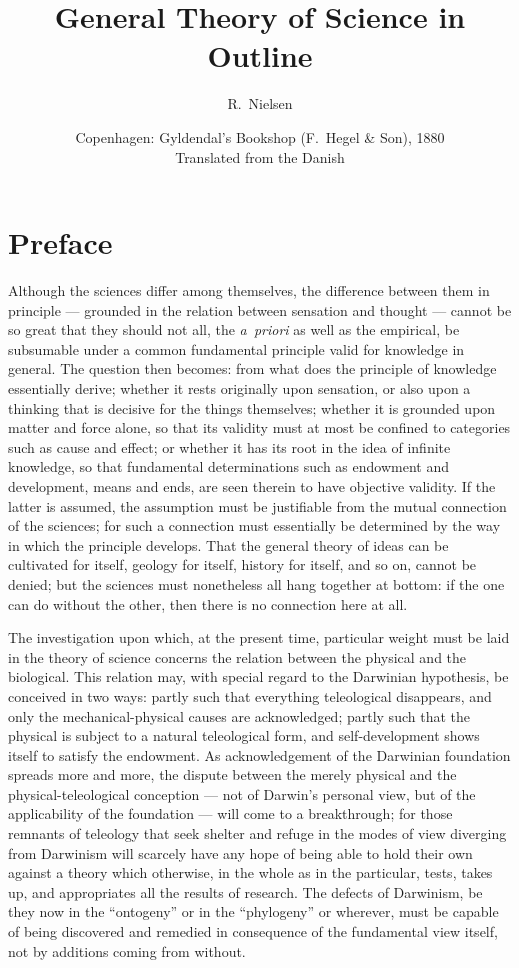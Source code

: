 \documentclass[12pt]{book}
\title{General Theory of Science in Outline}
\author{R.\ Nielsen}
\date{Copenhagen: Gyldendal's Bookshop (F.\ Hegel \& Son), 1880\\[6pt]
  \small Translated from the Danish}
\begin{document}
\maketitle
\tableofcontents

\chapter*{Preface}

\noindent Although the sciences differ among themselves, the difference
between them in principle --- grounded in the relation between sensation
and thought --- cannot be so great that they should not all, the
\textit{a~priori} as well as the empirical, be subsumable under a common
fundamental principle valid for knowledge in general. The question then
becomes: from what does the principle of knowledge essentially derive;
whether it rests originally upon sensation, or also upon a thinking that is
decisive for the things themselves; whether it is grounded upon matter and
force alone, so that its validity must at most be confined to categories
such as cause and effect; or whether it has its root in the idea of
infinite knowledge, so that fundamental determinations such as endowment
and development, means and ends, are seen therein to have objective
validity. If the latter is assumed, the assumption must be justifiable from
the mutual connection of the sciences; for such a connection must
essentially be determined by the way in which the principle develops. That
the general theory of ideas can be cultivated for itself, geology for
itself, history for itself, and so on, cannot be denied; but the sciences
must nonetheless all hang together at bottom: if the one can do without the
other, then there is no connection here at all.

The investigation upon which, at the present time, particular weight must
be laid in the theory of science concerns the relation between the physical
and the biological. This relation may, with special regard to the Darwinian
hypothesis, be conceived in two ways: partly such that everything
teleological disappears, and only the mechanical-physical causes are
acknowledged; partly such that the physical is subject to a natural
teleological form, and self-development shows itself to satisfy the
endowment. As acknowledgement of the Darwinian foundation spreads more and
more, the dispute between the merely physical and the
physical-teleological conception --- not of Darwin's personal view, but of
the applicability of the foundation --- will come to a breakthrough; for
those remnants of teleology that seek shelter and refuge in the modes of
view diverging from Darwinism will scarcely have any hope of being able to
hold their own against a theory which otherwise, in the whole as in the
particular, tests, takes up, and appropriates all the results of research.
The defects of Darwinism, be they now in the ``ontogeny'' or in the
``phylogeny'' or wherever, must be capable of being discovered and remedied
in consequence of the fundamental view itself, not by additions coming from
without.
\end{document}
